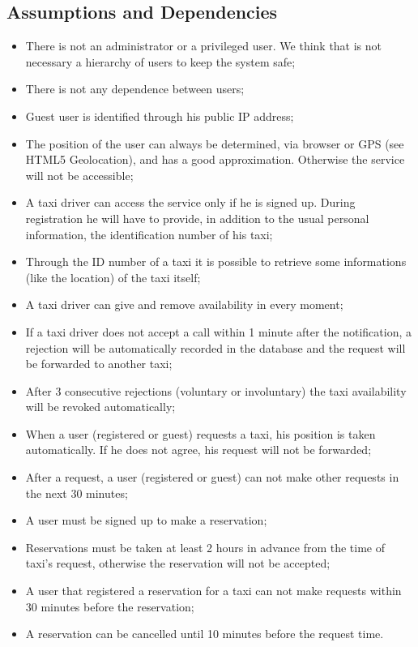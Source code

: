 	\subsection{Assumptions and Dependencies}
		\begin{itemize}
			\item There is not an administrator or a privileged user. We think that is not
			necessary a hierarchy of users to keep the system safe;
			\item There is not any dependence between users;
			\item Guest user is identified through his public IP address;
			\item The position of the user can always be determined, via browser or GPS
			(see HTML5 Geolocation), and has a good approximation. Otherwise the service will not
			be accessible;
			\item A taxi driver can access the service only if he is signed up. During
			registration he will have to provide, in addition to the usual personal information,
			the identification number of his taxi;
			\item Through the ID number of a taxi it is possible to retrieve some informations (like
			the location) of the taxi itself;
			\item A taxi driver can give and remove availability in every moment;
			\item If a taxi driver does not accept a call within 1 minute after the notification,
			a rejection will be automatically recorded in the database and the request will be
			forwarded to another taxi;
			\item After 3 consecutive rejections (voluntary or involuntary) the taxi availability
			will be revoked automatically;
			\item When a user (registered or guest) requests a taxi, his position is taken automatically.
			If he does not agree, his request will not be forwarded;
			\item After a request, a user (registered or guest) can not make other requests in the next 30 minutes;
			\item A user must be signed up to make a reservation;
			\item Reservations must be taken at least 2 hours in advance from the time of taxi's request,
			otherwise the reservation will not be accepted;
			\item A user that registered a reservation for a taxi can not make requests within 30 minutes
			before the reservation;
			\item A reservation can be cancelled until 10 minutes before the request time.
		\end{itemize}
